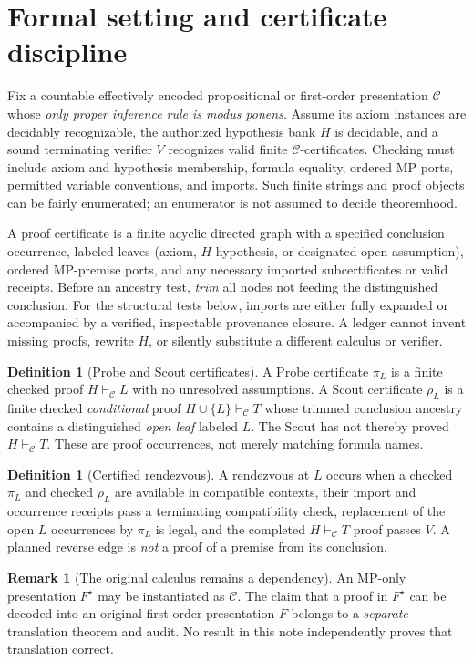 \documentclass[11pt,letterpaper]{article}
\theoremstyle{definition}
\newtheorem{definition}[theorem]{Definition}
\newtheorem{remark}[theorem]{Remark}
\newcommand{\C}{\mathcal C}
\newcommand{\vdC}{\vdash_{\mathcal C}}
\begin{document}
\section{Formal setting and certificate discipline}
Fix a countable effectively encoded propositional or first-order presentation
$\C$ whose \emph{only proper inference rule is modus ponens}. Assume its axiom
instances are decidably recognizable, the authorized hypothesis bank $H$ is
decidable, and a sound terminating verifier $V$ recognizes valid finite
$\C$-certificates. Checking must include axiom and hypothesis membership,
formula equality, ordered MP ports, permitted variable conventions, and
imports. Such finite strings and proof objects can be fairly enumerated; an
enumerator is not assumed to decide theoremhood.

A proof certificate is a finite acyclic directed graph with a specified
conclusion occurrence, labeled leaves (axiom, $H$-hypothesis, or designated
open assumption), ordered MP-premise ports, and any necessary imported
subcertificates or valid receipts. Before an ancestry test, \emph{trim} all
nodes not feeding the distinguished conclusion. For the structural tests below,
imports are either fully expanded or accompanied by a verified, inspectable
provenance closure. A ledger cannot invent missing proofs, rewrite $H$, or
silently substitute a different calculus or verifier.

\begin{definition}[Probe and Scout certificates]
A Probe certificate $\pi_L$ is a finite checked proof $H\vdC L$ with no
unresolved assumptions. A Scout certificate $\rho_L$ is a finite checked
\emph{conditional} proof $H\cup\{L\}\vdC T$ whose trimmed conclusion ancestry
contains a distinguished \emph{open leaf} labeled $L$. The Scout has not thereby
proved $H\vdC T$. These are proof occurrences, not merely matching formula names.
\end{definition}

\begin{definition}[Certified rendezvous]
A rendezvous at $L$ occurs when a checked $\pi_L$ and checked $\rho_L$ are
available in compatible contexts, their import and occurrence receipts pass
a terminating compatibility check, replacement of the open $L$ occurrences
by $\pi_L$ is legal, and the completed $H\vdC T$ proof passes $V$.
A planned reverse edge is \emph{not} a proof of a premise from its conclusion.
\end{definition}

\begin{remark}[The original calculus remains a dependency]
An MP-only presentation $F^\star$ may be instantiated as $\C$. The claim
that a proof in $F^\star$ can be decoded into an original first-order
presentation $F$ belongs to a \emph{separate} translation theorem and audit.
No result in this note independently proves that translation correct.
\end{remark}
\end{document}
